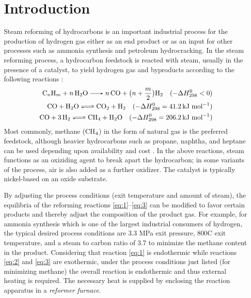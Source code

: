 \chapter{Introduction} \label{ch:introduction}

Steam reforming of hydrocarbons is an important industrial process for the production of hydrogen gas either as an end product or as an input for other processes such as ammonia synthesis and petroleum hydrocracking. In the steam reforming process, a hydrocarbon feedstock is reacted with steam, usually in the presence of a catalyst, to yield hydrogen gas and byproducts according to the following reactions \cite{rostrup-nielsen_catalytic_1984}:
\begin{align}
\ce{C_{n}H_{m} + n H2O -> n CO + } \bigl(n + \frac{m}{2}\bigr) \ce{H2} \quad (-\Delta{}H^{0}_{298} < 0) \label{eq:1} \\
\ce{CO + H2O <=> CO2 + H2} \quad (-\Delta{}H^{0}_{298} = 41.2 \, \text{kJ mol}^{-1}) \label{eq:2} \\
\ce{CO + 3H2 <=> CH4 + H2O} \quad (-\Delta{}H^{0}_{298} = 206.2 \, \text{kJ mol}^{-1}) \label{eq:3}
\end{align}
Most commonly, methane (CH$_{\textnormal{4}}$) in the form of natural gas is the preferred feedstock, although heavier hydrocarbons such as propane, naphtha, and heptane can be used depending upon availability and cost \cite{rostrup-nielsen_catalytic_1984,haussinger_hydrogen_2000}. In the above reactions, steam functions as an oxiziding agent to break apart the hydrocarbon; in some variants of the process, air is also added as a further oxidizer. The catalyst is typically nickel-based on an oxide substrate.

By adjusting the process conditions (exit temperature and amount of steam), the equilibria of the reforming reactions \ref{eq:1}--\ref{eq:3} can be modified to favor certain products and thereby adjust the composition of the product gas. For example, for ammonia synthesis which is one of the largest industrial consumers of hydrogen, the typical desired process conditions are 3.3 MPa exit pressure, 800C exit temperature, and a steam to carbon ratio of 3.7 \cite{rostrup-nielsen_catalytic_1984} to minimize the methane content in the product. Considering that reaction \ref{eq:1} is endothermic while reactions \ref{eq:2} and \ref{eq:3} are exothermic, under the process conditions just listed (for minimizing methane) the overall reaction is endothermic and thus external heating is required. The necessary heat is supplied by enclosing the reaction apparatus in a \emph{reformer furnace}.

